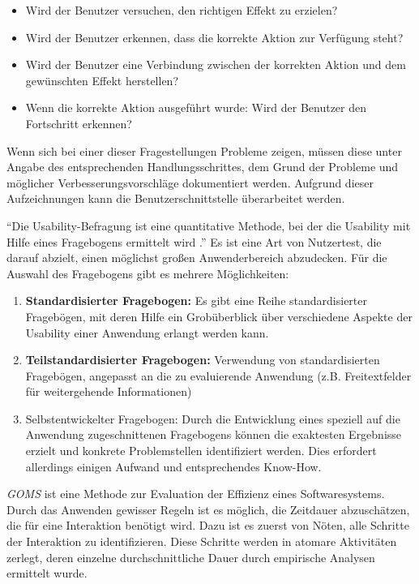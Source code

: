\begin{itemize}
	\item Wird der Benutzer versuchen, den richtigen Effekt zu erzielen?
	\item Wird der Benutzer erkennen, dass die korrekte Aktion zur Verfügung steht?
	\item Wird der Benutzer eine Verbindung zwischen der korrekten Aktion und dem gewünschten Effekt herstellen?
	\item Wenn die korrekte Aktion ausgeführt wurde: Wird der Benutzer den Fortschritt erkennen? \cite[S. 234]{Ullenboom2014}
\end{itemize}
Wenn sich bei einer dieser Fragestellungen Probleme zeigen, müssen diese unter Angabe des entsprechenden Handlungsschrittes, dem Grund der Probleme und möglicher Verbesserungsvorschläge dokumentiert werden. Aufgrund dieser Aufzeichnungen kann die Benutzerschnittstelle überarbeitet werden.\par
{}
\enquote{Die Usability-Befragung ist eine quantitative Methode, bei der die Usability mit Hilfe eines Fragebogens ermittelt wird \cite[S. 236]{Ullenboom2014}.} Es ist eine Art von Nutzertest, die darauf abzielt, einen möglichst großen Anwenderbereich abzudecken. Für die Auswahl des Fragebogens gibt es mehrere Möglichkeiten:
\begin{enumerate}
	\item \textbf{Standardisierter Fragebogen:} Es gibt eine Reihe standardisierter Fragebögen, mit deren Hilfe ein Grobüberblick über verschiedene Aspekte der Usability einer Anwendung erlangt werden kann.
	\item \textbf{Teilstandardisierter Fragebogen:} Verwendung von standardisierten Fragebögen, angepasst an die zu evaluierende Anwendung (z.B. Freitextfelder für weitergehende Informationen)
	\item Selbstentwickelter Fragebogen: Durch die Entwicklung eines speziell auf die Anwendung zugeschnittenen Fragebogens können die exaktesten Ergebnisse erzielt und konkrete Problemstellen identifiziert werden. Dies erfordert allerdings einigen Aufwand und entsprechendes Know-How.
\end{enumerate}
\textit{GOMS} ist eine Methode zur Evaluation der Effizienz eines Softwaresystems. Durch das Anwenden gewisser Regeln ist es möglich, die Zeitdauer abzuschätzen, die für eine Interaktion benötigt wird. Dazu ist es zuerst von Nöten, alle Schritte der Interaktion zu identifizieren. Diese Schritte werden in atomare Aktivitäten zerlegt, deren einzelne durchschnittliche Dauer durch empirische Analysen ermittelt wurde.\par
